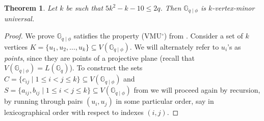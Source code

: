 \documentclass[10pt,a4paper]{article}
\newtheorem{theorem}{Theorem}[section]
\newcommand{\ls}{\leqslant}
\newcommand{\G}[1][q]{\mathbb{G}_{#1}}
\newcommand{\Gphi}[1][q]{\mathbb{G}_{#1\mid\phi}}
\begin{document}
\begin{theorem}
\label{theo:reduced-vmu}
    Let $k$ be such that $5k^2 -k -10 \ls 2q$. Then $\Gphi$ is $k$-vertex-minor universal.
\end{theorem}
\begin{proof}
    We prove $\Gphi$ satisfies the property (VMU$^\circ$) from . Consider a set of $k$  vertices  $K = \{u_1, u_2, \dots, u_k\} \subseteq V(\Gphi)$. We will alternately refer to $u_i$'s as \emph{points}, since they are points of a projective plane (recall that $V(\Gphi) = L(\G)$). To construct the sets  $C = \{c_{ij} \mid 1 \ls i < j \ls k \} \subseteq V(\Gphi)$ and
    $S = \{a_{ij},b_{ij} \mid 1 \ls i < j \ls k \} \subseteq V(\Gphi)$ from  we will proceed again by recursion, by running through pairs $(u_i, u_j)$ in some particular order, say in lexicographical order with respect to indexes $(i,j)$.


\end{proof}
\end{document}
